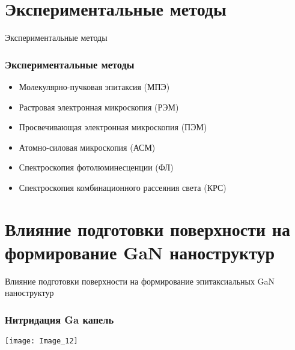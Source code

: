 \section{Экспериментальные методы}

\begin{frame}
	\begin{center}
		\Huge
		Экспериментальные методы
	\end{center}
\end{frame}

\begin{frame}
	\frametitle{Экспериментальные методы}
	\begin{itemize}
		\large
		\item Молекулярно-пучковая эпитаксия (МПЭ)
		\item Растровая электронная микроскопия (РЭМ)
		\item Просвечивающая электронная микроскопия (ПЭМ)
		\item Атомно-силовая микроскопия (АСМ)
		\item Спектроскопия фотолюминесценции (ФЛ)
		\item Спектроскопия комбинационного рассеяния света (КРС)
	\end{itemize}
\end{frame}

\section{Влияние подготовки поверхности на формирование GaN наноструктур}

\begin{frame}
	\begin{center}
		\Huge
		Влияние подготовки поверхности на формирование эпитаксиальных GaN наноструктур
	\end{center}
\end{frame}

\begin{frame}
	\frametitle{Нитридация Ga капель}
	\centering
	\texttt{[image: Image\_12]} \\
	\vfill
	\begin{minipage}[t]{0.4\linewidth}
	\end{minipage}
	\begin{minipage}[t]{0.4\linewidth}
	\end{minipage}
\end{frame}

